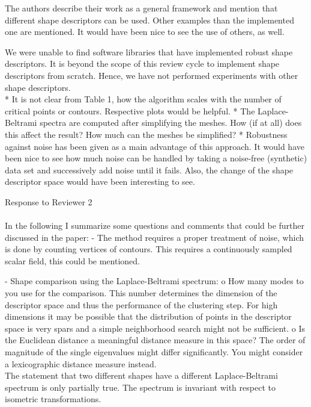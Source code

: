 \documentclass[10pt]{article}
\begin{document}
   The authors describe their work as a general framework and mention that
   different shape descriptors can be used. Other examples than the
   implemented one are mentioned. It would have been nice to see the use of
   others, as well. 

   {\color{blue} We were unable to find software libraries that have implemented
	robust shape descriptors. It is beyond the scope of this review cycle
	to implement shape descriptors from scratch. Hence, we have not
performed experiments with other shape descriptors.}\\

   * It is not clear from Table 1, how the algorithm scales with the number
   of critical points or contours. Respective plots would be helpful.
   * The Laplace-Beltrami spectra are computed after simplifying the meshes.
   How (if at all) does this affect the result? How much can the meshes be
   simplified?
   * Robustness against noise has been given as a main advantage of this
   approach. It would have been nice to see how much noise can be handled by
   taking a noise-free (synthetic) data set and successively add noise until
   it fails. Also, the change of the shape descriptor space would have been
   interesting to see.



{\noindent \LARGE Response to Reviewer 2}\\\\

	In the following I summarize some questions and comments that could be
   further discussed in the paper:
   - The method requires a proper treatment of noise, which is done by
   counting vertices of contours. This requires a continuously sampled
   scalar field, this could be mentioned.

   - Shape comparison using the Laplace-Beltrami spectrum:
   o How many modes to you use for the comparison. This number determines
   the dimension of the descriptor space and thus the performance of the
   clustering step. For high dimensions it may be possible that the
   distribution of points in the descriptor space is very spars and a simple
   neighborhood search might not be sufficient. 
   o Is the Euclidean distance a meaningful distance measure in this space?
   The order of magnitude of the single eigenvalues might differ
   significantly. You might consider a lexicographic distance measure
   instead.\\

   The statement that two different shapes have a different
   Laplace-Beltrami spectrum is only partially true. The spectrum is
   invariant with respect to isometric transformations.  
\end{document}
